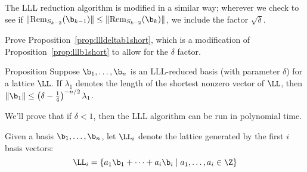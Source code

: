 The LLL reduction algorithm is modified in a similar way; wherever we check to see if $\|\text{Rem}_{S_{k-2}}(\b_{k-1})\|\leq\|\text{Rem}_{S_{k-2}}(\b_k)\|$, we include the factor $\sqrt{\delta}$.

\begin{explor}
	Prove Proposition~\ref{prop:llldeltab1short}, which is a modification of Proposition~\ref{prop:lllb1short} to allow for the $\delta$ factor.
\end{explor}

\begin{toprove}{Proposition}\label{prop:llldeltab1short}
	Suppose $\b_1,\ldots,\b_n$ is an LLL-reduced basis (with parameter $\delta$) for a lattice $\LL$. If $\lambda_1$ denotes the length of the shortest nonzero vector of $\LL$, then $\|\b_1\|\leq \left(\delta-\frac14\right)^{-n/2}\lambda_1$.
\end{toprove}

We'll prove that if $\delta<1$, then the LLL algorithm can be run in polynomial time. 

\begin{defn}
	Given a basis $\b_1,\ldots,\b_n$, let $\LL_i$ denote the lattice generated by the first $i$ basis vectors:
	\[\LL_i=\left\{a_1\b_1+\cdots+a_i\b_i\mid a_1,\ldots,a_i\in\Z \right\}\]
\end{defn}




